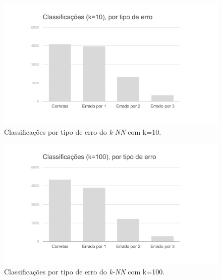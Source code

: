\documentclass[12pt]{article}
\begin{document}
\begin{figure}[H]
\centering\includegraphics[width=.65\linewidth]{graf-white10.png}
\caption{Classificações por tipo de erro do \emph{k-NN} com k=10.}
\label{fig:graf10}
\end{figure}

\begin{figure}[H]
\centering\includegraphics[width=.65\linewidth]{graf-white100.png}
\caption{Classificações por tipo de erro do \emph{k-NN} com k=100.}
\label{fig:graf100}
\end{figure}
\end{document}
